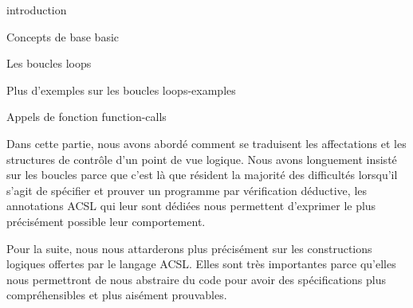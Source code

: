 \begin{levelTwo}
  {}
  {introduction}
\end{levelTwo}


\begin{levelTwo}
  {Concepts de base}
  {basic}
\end{levelTwo}

\begin{levelTwo}
  {Les boucles}
  {loops}
\end{levelTwo}

\begin{levelTwo}
  {Plus d'exemples sur les boucles}
  {loops-examples}
\end{levelTwo}

\begin{levelTwo}
  {Appels de fonction}
  {function-calls}
\end{levelTwo}

\horizontalLine


\newpage


Dans cette partie, nous avons abordé comment se traduisent les affectations et
les structures de contrôle d'un point de vue logique. Nous avons longuement
insisté sur les boucles parce que c'est là que résident la majorité des
difficultés lorsqu'il s'agit de spécifier et prouver un programme par
vérification déductive, les annotations ACSL qui leur sont dédiées nous
permettent d'exprimer le plus précisément possible leur comportement.



Pour la suite, nous nous attarderons plus précisément sur les constructions
logiques offertes par le langage ACSL. Elles sont très
importantes parce qu'elles nous permettront de nous abstraire
du code pour avoir des spécifications plus compréhensibles et plus aisément
prouvables.
